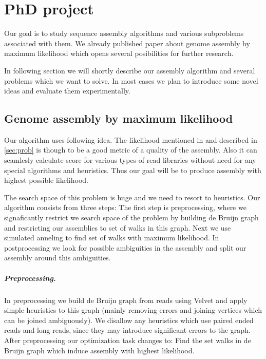 \chapter{PhD project}

Our goal is to study sequence assembly algorithms and
various subproblems associated with them.
We already published paper about genome assembly by maximum likelihood \citep{GAML}
which opens several posibilities for further research.

In following section we will shortly describe our assembly algorithm
and several problems which we want to solve.
In most cases we plan to introduce some novel ideas
and evaluate them experimentally.

\section{Genome assembly by maximum likelihood}

Our algorithm uses following idea.
The likelihood  mentioned in \cite{Ghodsi2013} and described in \ref{sec:prob} 
is though to be a good metric of a quality of the assembly.
Also it can seamlesly calculate score for various types of read libraries without need
for any special algorithms and heuristics. 
Thus our goal will be to produce assembly with highest possible likelihood.

The search space of this problem is huge and we need to resort to heuristics.
Our algorithm consists from three steps:
The first step is preprocessing, where we signaficantly restrict we search space of the problem
by building de Bruijn graph and restricting our assemblies to set of walks
in this graph. Next we use simulated anneling to find set of walks
with maximum likelihood. In postprocessing we look for possible
ambiguities in the assembly and split our assembly around this ambiguities.

\paragraph{Preprocessing.} In preprocessing we build de Bruijn graph from reads
using Velvet \cite{Velvet} and apply simple heuristics to this graph
 (mainly removing errors and joining vertices which can be joined ambiguously).
We disallow any heuristics which use paired ended reads and long reads,
since they may introduce significant errors to the graph.
After preprocessing our optimization task changes to: Find the set walks
in de Bruijn graph which induce assembly with highest likelihood.

